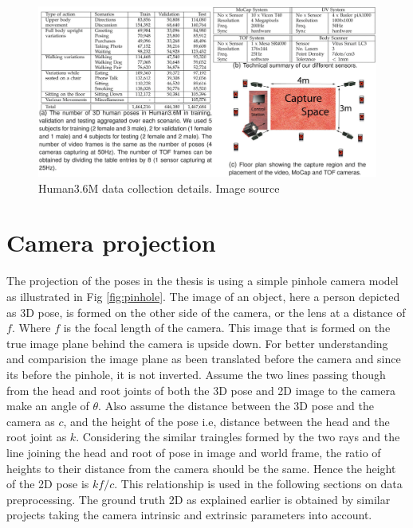 \begin{figure}[h]
    \centering
    \includegraphics[width=\textwidth]{figures/h36/data_collection.pdf}
    \caption{Human3.6M data collection details. Image source \cite{H3.6}}
    \label{fig:h36_data_collection}
\end{figure}

\section{Camera projection}
\label{camera_projection}

The projection of the poses in the thesis is using a simple pinhole camera model as illustrated in Fig \ref{fig:pinhole}. The image of an object, here a person depicted as 3D pose, is formed on the other side of the camera, or the lens at a distance of $f$. Where $f$ is the focal length of the camera. This image that is formed on the true image plane behind the camera is upside down. For better understanding and comparision the image plane as been translated before the camera and since its before the pinhole, it is not inverted. Assume the two lines passing though from the head and root joints of both the 3D pose and 2D image to the camera make an angle of $\theta$. Also assume the distance between the 3D pose and the camera as $c$, and the height of the pose i.e, distance between the head and the root joint as $k$. Considering the similar traingles formed by the two rays and the line joining the head and root of pose in image and world frame, the ratio of heights to their distance from the camera should be the same. Hence the height of the 2D pose is $k f/c$. This relationship is used in the following sections on data preprocessing. The ground truth 2D as explained earlier is obtained by similar projects taking the camera intrinsic and extrinsic parameters into account.

